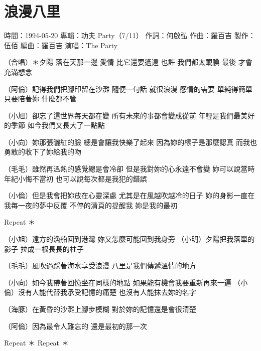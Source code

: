 \documentclass[UTF8,a4paper,oneside,twocolumn,12pt]{ctexbook}
\newcommand{\infopair}[2]{\textbullet #1：#2}
\newcommand{\zc}[1][伍佰]{\infopair{作詞}{#1}}
\newcommand{\zq}[1][伍佰]{\infopair{作曲}{#1}}
\newcommand{\bq}[1][伍佰]{\infopair{編曲}{#1}}
\newcommand{\zj}[1]{\infopair{專輯}{#1}}
\newcommand{\zz}[1]{\infopair{製作}{#1}}
\newcommand{\sj}[1]{\infopair{時間}{#1}}
\newenvironment{info}{\begin{flushleft}\kaishu
	}
	{\end{flushleft}\normalsize\yahei\par}
\newenvironment{lyric}{
	}
{}
\begin{document}
\section{浪漫八里}
\begin{info}
	\sj{1994-05-20}
	\zj{功夫 Party（7/11）}
	\zc[何啟弘]
	\zq[羅百吉]
	\zz{伍佰}
	\bq[羅百吉]
	\infopair{演唱}{The Party}
\end{info}
\begin{lyric}
	（合唱）＊夕陽 落在天那一邊 愛情 比它還要遙遠
	也許 我們都太靦腆 最後 才會充滿想念

	（阿倫）記得我們把腳印留在沙灘 隨便一句話 就很浪漫
	感情的需要 單純得簡單 只要陪著妳 什麼都不管

	（小旭）卻忘了這世界每天都在變 所有未來的事都會變成從前
	年輕是我們最美好的季節 如今我們又長大了一點點

	（小向）妳那張曬紅的臉 總是會讓我快樂了起來
	因為妳的樣子是那麼認真 而我也勇敢的收下了妳給我的吻

	（毛毛）雖然再溫熱的感覺總是會冷卻 但是我對妳的心永遠不會變
	妳可以說當時年紀小悔不當初 也可以說每次都是我犯的錯誤

	（小倫）但是我會把妳放在心靈深處 尤其是在風越吹越冷的日子
	妳的身影一直在我每一夜的夢中反覆
	不停的清頁的提醒我 妳是我的最初

	Repeat ＊

	（小旭）遠方的漁船回到港灣 妳又怎麼可能回到我身旁
	（小明）夕陽把我落單的影子 拉成一根長長的柱子

	（毛毛）風吹過踩著海水享受浪漫 八里是我們傳遞溫情的地方

	（小向）如今我帶著回憶坐在同樣的地點
	如果能有機會我要重新再來一遍
	（小倫）沒有人能代替我承受記憶的痛楚
	也沒有人能抹去妳的名字

	（海豚）在黃昏的沙灘上腳步模糊 對於妳的記憶還是會很清楚

	（阿倫）因為最令人難忘的 還是最初的那一次

	Repeat ＊
	Repeat ＊
\end{lyric}
\end{document}
